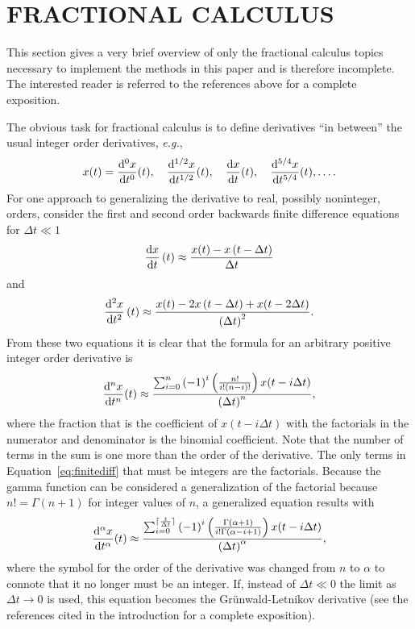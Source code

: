 \section{FRACTIONAL CALCULUS}
\label{sec:fractional}

  This section gives a very brief overview of only the fractional calculus
  topics necessary to implement the methods in this paper and is therefore
  incomplete. The interested reader is referred to the references above for a
  complete exposition.

  The obvious task for fractional calculus is to define derivatives ``in
  between'' the usual integer order derivatives, \textit{e.g.}, 
\[
x(t) = \frac{\mathrm{d}^0 x}{\mathrm{d} t^0}(t), \quad\frac{\mathrm{d}^{1/2} x}{\mathrm{d}
t^{1/2}}(t), \quad \frac{\mathrm{d} x}{\mathrm{d} t}(t),  \quad \frac{\mathrm{d}^{5/4} x}{\mathrm{d}
t^{5/4}}(t), \ldots.
\]
  For one approach to generalizing the derivative to real, possibly noninteger,
  orders, consider the first and second order backwards finite difference
  equations for $\Delta t \ll 1$
\[
 \frac{\mathrm{d} x}{\mathrm{d} t}\left(t\right) \approx \frac{x(t) - x \left(t - \Delta
 t\right)}{\Delta t}
 \]
 and
 \[
    \frac{\mathrm{d}^2 x}{\mathrm{d} t^2}\left(t\right) \approx \frac{x(t) - 2 x \left(t - \Delta
    t\right) + x(t - 2 \Delta t)}{\left( \Delta t \right)^2}.
 \]
 From these two equations it is clear that the formula for an arbitrary positive
 integer order derivative is
 \begin{equation}
  \frac{\mathrm{d}^n x}{\mathrm{d} t^n}(t) \approx \frac{\sum_{i=0}^n \left( -1 \right)^i
  \left( \frac{n!}{i! \left( n - i \right)!} \right) x ( t - i \Delta t )}{\left( \Delta t
  \right)^n},
  \label{eq:finitediff}
 \end{equation}
 where the fraction that is the coefficient of $x(t - i \Delta t)$ with the
 factorials in the numerator and denominator is the binomial coefficient. Note
 that the number of terms in the sum is one more than the order of the
 derivative.  The only terms in Equation~\ref{eq:finitediff} that must be
 integers are the factorials. Because the gamma function can be considered a
 generalization of the factorial because $n! = \Gamma(n+1)$ for integer values
 of $n$, a generalized equation results with
 \begin{equation}
    \frac{\mathrm{d}^\alpha x}{\mathrm{d} t^\alpha}(t) \approx \frac{\sum_{i=0}^{\lceil
    \frac{t}{\Delta t} \rceil} \left( -1 \right)^i \left(
    \frac{\Gamma(\alpha+1)}{i! \Gamma\left( \alpha - i + 1\right)} \right) x ( t
    - i \Delta t )}{\left( \Delta t \right)^\alpha},
    \label{eq:gw}
 \end{equation}
 where the symbol for the order of the derivative was changed from $n$ to
 $\alpha$ to connote that it no longer must be an integer. 
 If, instead of $\Delta t \ll 0$ the limit as $\Delta t \rightarrow 0$ is used,
 this equation becomes the Gr\"unwald-Letnikov derivative (see the references
 cited in the introduction for a complete exposition). 
  
